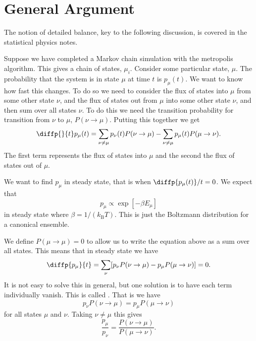 \documentclass[fleqn]{NotesClass}
\newcommand*{\boltzmann}{k_{\mathrm{B}}}
\begin{document}
    \section{General Argument}
    \begin{rmk}
        The notion of detailed balance, key to the following discussion, is covered in the statistical physics notes.
    \end{rmk}
    Suppose we have completed a Markov chain simulation with the metropolis algorithm.
    This gives a chain of states, \(\mu_i\).
    Consider some particular state, \(\mu\).
    The probability that the system is in state \(\mu\) at time \(t\) is \(p_\mu(t)\).
    We want to know how fast this changes.
    To do so we need to consider the flux of states into \(\mu\) from some other state \(\nu\), and the flux of states out from \(\mu\) into some other state \(\nu\), and then sum over all states \(\nu\).
    To do this we need the transition probability for transition from \(\nu\) to \(\mu\), \(P(\nu \to \mu)\).
    Putting this together we get
    \begin{equation}
        \diffp{}{t}p_{\mu}(t) = \sum_{\nu \ne \mu} p_\nu(t) P(\nu \to \mu) - \sum_{\nu \ne \mu} p_{\mu}(t)P(\mu \to \nu).
    \end{equation}
    The first term represents the flux of states into \(\mu\) and the second the flux of states out of \(\mu\).
    
    We want to find \(p_\mu\) in steady state, that is when \(\diffp{p_\mu(t)}/{t} = 0\).
    We expect that
    \begin{equation}
        p_\mu \propto \exp[-\beta E_\mu]
    \end{equation}
    in steady state where \(\beta = 1/(\boltzmann T)\).
    This is just the Boltzmann distribution for a canonical ensemble.
    
    We define \(P(\mu \to \mu) = 0\) to allow us to write the equation above as a sum over all states.
    This means that in steady state we have
    \begin{equation}
        \diffp{p_\mu}{t} = \sum_{\nu}[p_\nu P(\nu \to \mu) - p_\mu P(\mu \to \nu)] = 0.
    \end{equation}
    It is not easy to solve this in general, but one solution is to have each term individually vanish.
    This is called .
    That is we have
    \begin{equation}
        p_\nu P(\nu \to \mu) = p_\mu P(\mu \to \nu)
    \end{equation}
    for all states \(\mu\) and \(\nu\).
    Taking \(\nu \ne \mu\) this gives
    \begin{equation}
        \frac{p_\mu}{p_\nu} = \frac{P(\nu \to \mu)}{P(\mu \to \nu)}.
    \end{equation}
    
\end{document}
